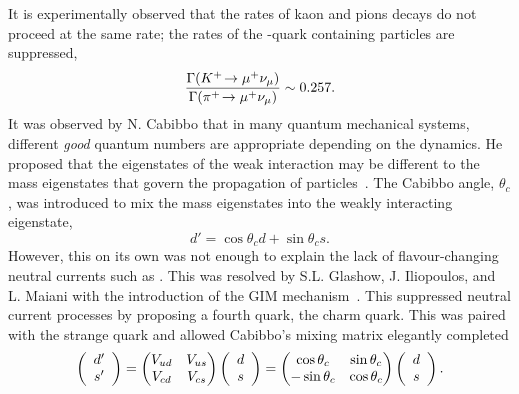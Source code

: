 It is experimentally observed that the rates of kaon and pions decays do not proceed at the same rate; the rates of the \squark-quark containing particles are suppressed,
\begin{equation}
\frac{\Gamma({{K}^+}\!\rightarrow {\ensuremath{\mu^+}}{\ensuremath{{\nu}_\mu}})}{\Gamma({{\pi}^+}\!\rightarrow {\ensuremath{\mu^+}}{\ensuremath{{\nu}_\mu}})}\sim 0.257.
\end{equation}
It was observed by N. Cabibbo that in many quantum mechanical systems, different \emph{good} quantum numbers are appropriate depending on the dynamics. He proposed that the eigenstates of the weak interaction may be different to the mass eigenstates that govern the propagation of particles~\cite{PhysRevLett.10.531}.
The Cabibbo angle, $\theta_{c}$, was introduced to mix the mass eigenstates into the weakly interacting eigenstate,
\begin{equation}
d' = \cos{\theta_{c}}d + \sin{\theta_{c}}s.
\end{equation}
However, this on its own was not enough to explain the lack of flavour-changing neutral currents such as \decay{\Kz}{\mup\mun}. This was resolved by S.L. Glashow, J. Iliopoulos, and L. Maiani with the introduction of the GIM mechanism~\cite{PhysRevD.2.1285}. This suppressed neutral current processes by proposing a fourth quark, the charm quark. This was paired with the strange quark and allowed  Cabibbo's mixing matrix elegantly completed
\begin{equation}
\left( \begin{array}{c} d' \\ s'  \end{array} \right) = \begin{pmatrix} {\ensuremath{V_{{u}{d}}}} & {V_{{u}{s}}} \\ {V_{{c}{d}}} & {V_{{c}{s}}} \end{pmatrix} \left( \begin{array}{c} d \\ s \end{array} \right)= \begin{pmatrix} \cos{\theta_{c}} & \sin{\theta_{c}} \\ -\sin{\theta_{c}} & \cos{\theta_{c}} \end{pmatrix} \left( \begin{array}{c} d \\ s \end{array} \right).
\end{equation}

